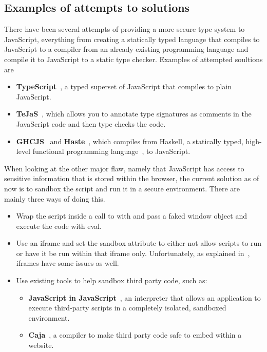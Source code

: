 \subsection{Examples of attempts to solutions}
There have been several attempts of providing a more secure type system to JavaScript, everything from creating a statically typed language that compiles to JavaScript to a compiler from an already existing programming language and compile it to JavaScript to a static type checker. Examples of attempted soultions are
\begin{itemize}
  \item \textbf{TypeScript}~\cite{typescript}, a typed superset of JavaScript that compiles to plain JavaScript.
  \item \textbf{TeJaS}~\cite{tejas-art,tejas-git}, which allows you to annotate type signatures as comments in the JavaScript code and then type checks the code.
  \item \textbf{GHCJS}~\cite{ghcjs} and \textbf{Haste}~\cite{haste-lang,haste-symposium}, which compiles from Haskell, a statically typed, high-level functional programming language~\cite{haskell}, to JavaScript.
\end{itemize}

When looking at the other major flaw, namely that JavaScript has access to sensitive information that is stored within the browser, the current solution as of now is to sandbox the script and run it in a secure environment. There are mainly three ways of doing this.
\begin{itemize}
  \item Wrap the script inside a call to with and pass a faked window object and execute the code with eval.
  \item Use an iframe and set the sandbox attribute to either not allow scripts to run or have it be run within that iframe only. Unfortunately, as explained in~\cite{js_in_js}, iframes have some issues as well.
  \item Use existing tools to help sandbox third party code, such as:
    \begin{itemize}
      \item \textbf{JavaScript in JavaScript}~\cite{js_in_js}, an interpreter that allows an application to execute third-party scripts in a completely isolated, sandboxed environment.
      \item \textbf{Caja}~\cite{caja_spec}, a compiler to make third party code safe to embed within a website.
    \end{itemize}
\end{itemize}
